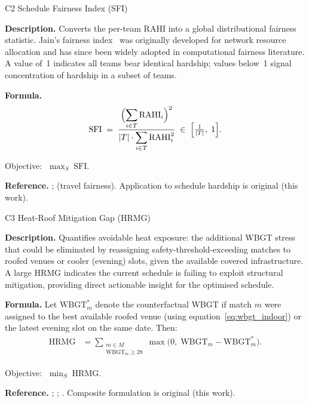 \documentclass[12pt, letterpaper]{article}
\newcommand{\kpilabel}[1]{\noindent\textbf{#1}\enspace}
\begin{document}
\begin{kpibox}{C2 \textendash{} Schedule Fairness Index (SFI)}

\kpilabel{Description.}
Converts the per-team RAHI into a global distributional fairness
statistic.  Jain's fairness index~\citep{Jain1984} was originally
developed for network resource allocation and has since been widely
adopted in computational fairness literature.  A value of~1 indicates
all teams bear identical hardship; values below~1 signal concentration
of hardship in a subset of teams.

\medskip
\kpilabel{Formula.}
\begin{align*}
  \mathrm{SFI} \;=\;
    \frac{\Bigl(\displaystyle\sum_{i \in T}
      \mathrm{RAHI}_i\Bigr)^2}
         {|T|\cdot\displaystyle\sum_{i \in T} \mathrm{RAHI}_i^2}
  \;\in\;\Bigl[\tfrac{1}{|T|},\;1\Bigr].
\end{align*}
\vspace{-8pt}

\noindent
Objective: $\;\displaystyle\max_{S}\;\mathrm{SFI}$.

\medskip
\kpilabel{Reference.}
\citet{Jain1984}; \citet{GuajardoEtAl2026} (travel fairness).
Application to schedule hardship is original (this work).
\end{kpibox}

\begin{kpibox}{C3 \textendash{} Heat-Roof Mitigation Gap (HRMG)}

\kpilabel{Description.}
Quantifies avoidable heat exposure: the additional WBGT stress that
could be eliminated by reassigning safety-threshold-exceeding matches to
roofed venues or cooler (evening) slots, given the available covered
infrastructure.  A large HRMG indicates the current schedule is failing
to exploit structural mitigation, providing direct actionable insight
for the optimised schedule.

\medskip
\kpilabel{Formula.}
Let $\mathrm{WBGT}^*_m$ denote the counterfactual WBGT if match $m$
were assigned to the best available roofed venue (using
equation~\eqref{eq:wbgt_indoor}) or the latest evening slot on the same
date.  Then:
\begin{align*}
  \mathrm{HRMG} &= \sum_{\substack{m \in M \\
    \mathrm{WBGT}_m \geq 28}}
    \max\!\bigl(0,\;\mathrm{WBGT}_m - \mathrm{WBGT}^*_m\bigr).
\end{align*}
\vspace{-8pt}

\noindent
Objective: $\;\displaystyle\min_{S}\;\mathrm{HRMG}$.

\medskip
\kpilabel{Reference.}
\citet{FIFPRO2025}; \citet{Liljegren2008};
\citet{WorldWeatherAttribution2026}.
Composite formulation is original (this work).
\end{kpibox}
\end{document}
